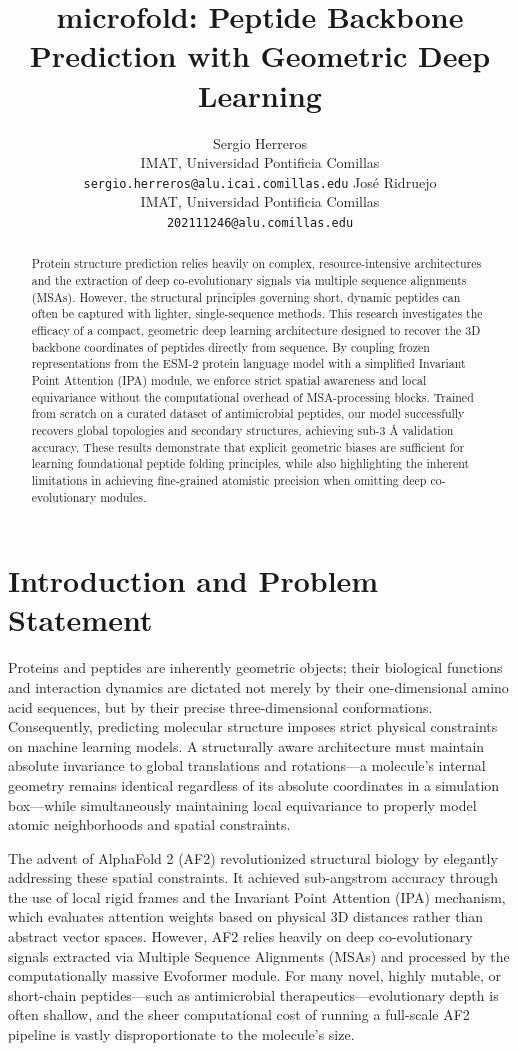 \documentclass{article}
\title{microfold: Peptide Backbone Prediction with Geometric Deep Learning}
\author{
Sergio Herreros \\
IMAT, Universidad Pontificia Comillas \\
\texttt{sergio.herreros@alu.icai.comillas.edu}
\And
José Ridruejo \\
IMAT, Universidad Pontificia Comillas \\
\texttt{202111246@alu.comillas.edu}
}
\begin{document}
\maketitle

\begin{abstract}
Protein structure prediction relies heavily on complex, resource-intensive architectures and the extraction of deep co-evolutionary signals via multiple sequence alignments (MSAs). However, the structural principles governing short, dynamic peptides can often be captured with lighter, single-sequence methods. This research investigates the efficacy of a compact, geometric deep learning architecture designed to recover the 3D backbone coordinates of peptides directly from sequence. By coupling frozen representations from the ESM-2 protein language model with a simplified Invariant Point Attention (IPA) module, we enforce strict spatial awareness and local equivariance without the computational overhead of MSA-processing blocks. Trained from scratch on a curated dataset of antimicrobial peptides, our model successfully recovers global topologies and secondary structures, achieving sub-3 \AA{} validation accuracy. These results demonstrate that explicit geometric biases are sufficient for learning foundational peptide folding principles, while also highlighting the inherent limitations in achieving fine-grained atomistic precision when omitting deep co-evolutionary modules.
\end{abstract}

\section{Introduction and Problem Statement}
\label{sec:intro}

Proteins and peptides are inherently geometric objects; their biological functions and interaction dynamics are dictated not merely by their one-dimensional amino acid sequences, but by their precise three-dimensional conformations. Consequently, predicting molecular structure imposes strict physical constraints on machine learning models. A structurally aware architecture must maintain absolute invariance to global translations and rotations---a molecule's internal geometry remains identical regardless of its absolute coordinates in a simulation box---while simultaneously maintaining local equivariance to properly model atomic neighborhoods and spatial constraints.

The advent of AlphaFold 2 (AF2) revolutionized structural biology by elegantly addressing these spatial constraints. It achieved sub-angstrom accuracy through the use of local rigid frames and the Invariant Point Attention (IPA) mechanism, which evaluates attention weights based on physical 3D distances rather than abstract vector spaces. However, AF2 relies heavily on deep co-evolutionary signals extracted via Multiple Sequence Alignments (MSAs) and processed by the computationally massive Evoformer module. For many novel, highly mutable, or short-chain peptides---such as antimicrobial therapeutics---evolutionary depth is often shallow, and the sheer computational cost of running a full-scale AF2 pipeline is vastly disproportionate to the molecule's size.
\end{document}
